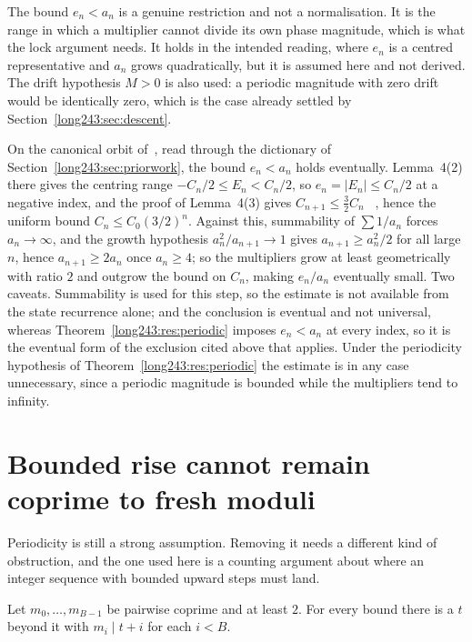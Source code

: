 \documentclass[11pt]{article}
\begin{document}
The bound $e_n<a_n$ is a genuine restriction and not a normalisation.  It is
the range in which a multiplier cannot divide its own phase magnitude, which
is what the lock argument needs.  It holds in the intended reading, where
$e_n$ is a centred representative and $a_n$ grows quadratically, but it is
assumed here and not derived.  The drift hypothesis $M>0$ is also used: a
periodic magnitude with zero drift would be identically zero, which is the case
already settled by Section~\ref{long243:sec:descent}.

\begin{remark}
On the canonical orbit of~\cite{koizumi2025}, read through the dictionary of
Section~\ref{long243:sec:priorwork}, the bound $e_n<a_n$ holds eventually.  Lemma~4(2)
there gives the centring range $-C_n/2\le E_n<C_n/2$, so $e_n=|E_n|\le C_n/2$ at
a negative index, and the proof of Lemma~4(3) gives $C_{n+1}\le\tfrac32C_n$
~\cite[pp.~11--12]{koizumi2025},
hence the uniform bound $C_n\le C_0(3/2)^{n}$.  Against this, summability of
$\sum1/a_n$ forces
$a_n\to\infty$, and the growth hypothesis $a_n^{2}/a_{n+1}\to1$ gives
$a_{n+1}\ge a_n^{2}/2$ for all large $n$, hence $a_{n+1}\ge2a_n$ once
$a_n\ge4$; so the multipliers grow at least geometrically with ratio $2$ and
outgrow the bound on $C_n$, making $e_n/a_n$ eventually small.  Two caveats.
Summability is used for this step, so the estimate is not available from the
state recurrence alone; and the conclusion is eventual and not universal,
whereas Theorem~\ref{long243:res:periodic} imposes $e_n<a_n$ at every index, so it is
the eventual form of the exclusion cited above that applies.  Under the
periodicity hypothesis of Theorem~\ref{long243:res:periodic} the estimate is in any
case unnecessary, since a periodic magnitude is bounded while the multipliers
tend to infinity.
\end{remark}

\section{Bounded rise cannot remain coprime to fresh moduli}\label{long243:sec:barrier}

Periodicity is still a strong assumption.  Removing it needs a different kind
of obstruction, and the one used here is a counting argument about where an
integer sequence with bounded upward steps must land.

\begin{lemma}\label{long243:res:crt}
Let $m_0,\ldots,m_{B-1}$ be pairwise coprime and at least $2$.  For every bound
there is a $t$ beyond it with $m_i\mid t+i$ for each $i<B$.
\end{lemma}
\end{document}
